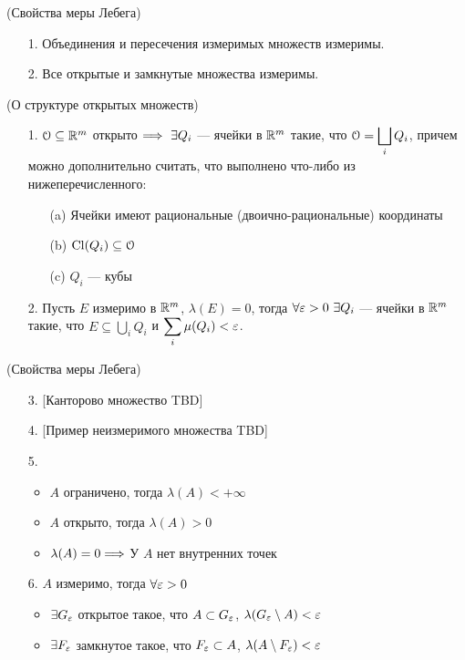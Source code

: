 \begin{theorem}(Свойства меры Лебега)
    \begin{itemize}
        \item[1.] Объединения и пересечения измеримых множеств измеримы.
        \item[2.] Все открытые и замкнутые множества измеримы.
    \end{itemize}
\end{theorem}

\begin{lemma}(О структуре открытых множеств)
    \begin{itemize}
        \item[1.] $\mathcal{O} \subseteq \mathbb{R}^m$ открыто $\Longrightarrow~ \exists Q_i$ --- ячейки в $\mathbb{R}^m$
        такие, что $\displaystyle \mathcal{O} = \bigsqcup_{i}{Q_i}$, причем можно
        дополнительно считать, что выполнено что-либо из нижеперечисленного:
        \begin{itemize}
            \item[(a)] Ячейки имеют рациональные (двоично-рациональные) координаты
            \item[(b)] $\operatorname{Cl}(Q_i) \subseteq \mathcal{O}$
            \item[(c)] $Q_i$ --- кубы
        \end{itemize}
        \item[2.] Пусть $E$ измеримо в $\mathbb{R}^m$, $\lambda(E) = 0$, тогда
        $\forall \varepsilon > 0~\exists Q_i$ --- ячейки в $\mathbb{R}^m$ такие, что
        $\displaystyle E \subseteq \bigcup_{i}{Q_i}$ и $\displaystyle
        \sum_{i}{\mu(Q_i)} < \varepsilon$.
    \end{itemize}
\end{lemma}

\begin{theorem}(Свойства меры Лебега)
    \begin{itemize}
        \item[3.] [Канторово множество TBD]
        \item[4.] [Пример неизмеримого множества TBD]
        \item[5.] \begin{itemize}
                    \item $A$ ограничено, тогда $\lambda(A) < +\infty$
                    \item $A$ открыто, тогда $\lambda(A) > 0$
                    \item $\lambda(A) = 0 \Longrightarrow$ У $A$ нет внутренних точек
                  \end{itemize}
        \item[6.] $A$ измеримо, тогда $\forall \varepsilon > 0$
                \begin{itemize}
                    \item $\exists G_{\varepsilon}$ открытое такое, что
                    $A \subset G_{\varepsilon}$, $\lambda(G_{\varepsilon} \setminus A) < \varepsilon$
                    \item $\exists F_{\varepsilon}$ замкнутое такое, что
                    $F_{\varepsilon} \subset A$, $\lambda(A \setminus F_{\varepsilon}) < \varepsilon$
                \end{itemize}
    \end{itemize}
\end{theorem}

